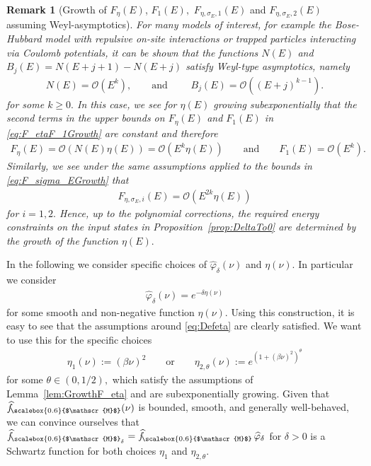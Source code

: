 \documentclass[11pt]{amsart}
\newcommand{\1}{\mathbbm{1}}
\renewcommand{\phi}{\varphi}
\newcommand{\hatfM}{\widehat{f}_{\!\scalebox{0.6}{$\mathscr{M}$}}
}
\newcommand{\hatfMdelta}{\widehat{f}_{\!\scalebox{0.6}{$\mathscr{M}$}_\delta}}
\theoremstyle{plain}
\newtheorem{remark}[theorem]{Remark}
\theoremstyle{definition}
\theoremstyle{remark}
\numberwithin{equation}{section}
\begin{document}
\begin{remark} [Growth of $F_\eta(E)$, $F_1(E),$ $F_{\eta,\sigma_E,1}(E)$ and $F_{\eta,\sigma_E,2}(E)$ assuming Weyl-asymptotics]
For many models of interest, for example the Bose-Hubbard model with repulsive on-site interactions or trapped particles interacting via Coulomb potentials, it can be shown that the functions $N(E)$ and $B_j(E)= N(E+j+1)-N(E+j)$ satisfy \emph{Weyl-type asymptotics}, namely
\begin{align*}
    N(E) = \mathcal{O}( E^k), \qquad\text{and }\qquad B_j(E) = \mathcal{O}((E+j)^{k-1}).
\end{align*}
for some $k\ge 0.$ In this case, we see for  $\eta(E)$ growing subexponentially that the second terms in the upper bounds on $F_{\eta}(E)$ and $F_1(E)$ in \eqref{eq:F_etaF_1Growth} are constant and therefore
\begin{align*}
    F_{\eta}(E) = \mathcal{O}\left(N(E)\eta(E)\right) = \mathcal{O}\left(E^k\eta(E)\right)\qquad\text{and}\qquad F_{1}(E) =  \mathcal{O}\left(E^k\right).
\end{align*}
Similarly, we see under the same assumptions applied to the bounds in \eqref{eq:F_sigma_EGrowth} that
\begin{align*}
    F_{\eta,\sigma_E,i}(E)  = \mathcal{O}\left(E^{2k}\eta(E)\right)
\end{align*}
for $i=1,2.$ Hence, up to the polynomial corrections, the required energy constraints on the input states in Proposition~\ref{prop:DeltaTo0} are determined by the growth of the function $\eta(E).$
\end{remark}

\medskip 

 \noindent In the following we consider specific choices of $\widehat \phi_\delta(\nu)$ and $\eta(\nu).$ In particular we consider
\begin{align*}
    \widehat \phi_{\delta}(\nu) = e^{-\delta \eta(\nu)}
\end{align*}
for some smooth and non-negative function $\eta(\nu).$ Using this construction, it is easy to see that the assumptions around \eqref{eq:Defeta} are clearly satisfied. We want to use this for the specific choices
\begin{align*}
    \eta_1(\nu) := (\beta\nu)^2\qquad\text{or}\qquad \eta_{2,\theta}(\nu) := e^{(1+(\beta\nu)^2)^\theta}
\end{align*}
for some $\theta\in(0,1/2),$ which satisfy the assumptions of Lemma~\ref{lem:GrowthF_eta} and are subexponentially growing. Given that $\hatfM(\nu)$ is bounded, smooth, and generally well-behaved, we can convince ourselves that $\hatfMdelta = \hatfM \,\widehat\phi_\delta$ for $\delta>0$ is a Schwartz function for  both choices $\eta_1$ and $\eta_{2,\theta}.$
\end{document}

